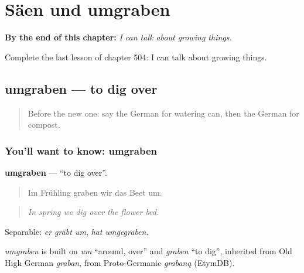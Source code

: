 
\chapter{Säen und umgraben}
\label{ch:ge-saen-und-umgraben}

\begin{chapteropening}
\textbf{By the end of this chapter:} \emph{I can talk about growing things.}

Complete the last lesson of chapter 504: I can talk about growing things.
\end{chapteropening}

\section[umgraben]{umgraben — to dig over}

\label{lesson:GE-C504-umgraben}



\begin{quote}
Before the new one: say the German for watering can, then the German for compost.
\end{quote}

\subsection*{You'll want to know: umgraben}
\textbf{umgraben} — \textquotedblleft{}to dig over\textquotedblright{}.

\begin{quote}
Im Frühling graben wir das Beet um.
\end{quote}

\begin{quote}
\emph{In spring we dig over the flower bed.}
\end{quote}

Separable: \emph{er gräbt um}, \emph{hat umgegraben}.

\begin{cousinweb}
\emph{umgraben} is built on \emph{um} \textquotedblleft{}around, over\textquotedblright{} and \emph{graben} \textquotedblleft{}to dig\textquotedblright{}, inherited from Old High German \emph{graban}, from Proto-Germanic \emph{grabaną} (EtymDB).
\end{cousinweb}

